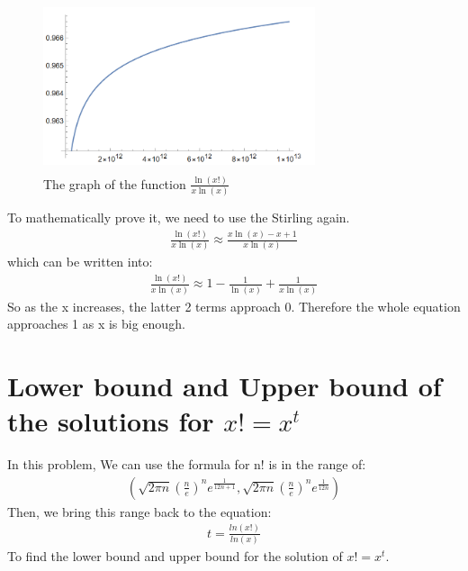 \documentclass{article}
\begin{document}
            \begin{figure}[h]
                \centering
                \includegraphics[width=8cm, height=5cm]{202.png}
                \caption{The graph of the function $\frac{\ln(x!)}{x\ln(x)}$}
                \end{figure}

        To mathematically prove it, we need to use the Stirling again.
            \begin{align*}
                \frac{\ln(x!)}{x\ln(x)} \approx \frac{x \ln(x) - x + 1}{x \ln(x)}
            \end{align*}
        which can be written into:
            \begin{align*}
                \frac{\ln(x!)}{x\ln(x)} \approx 1 - \frac{1}{\ln(x)} + \frac{1}{x\ln(x)}
            \end{align*}
        So as the x increases, the latter 2 terms approach 0. Therefore the whole equation approaches 1 as x is big enough.
        \section{Lower bound and Upper bound of the solutions for $x! = x ^ {t}$ }
        In this problem, We can use the formula for n! is in the range of:
            \begin{align*}
                (\sqrt{2\pi n} (\frac{n}{e})^n e^{\frac{1}{12n+1}},\sqrt{2\pi n} (\frac{n}{e})^n e^{\frac{1}{12n}})
            \end{align*}
        Then, we bring this range back to the equation:\\
            \begin{align*}
                t = \frac{ln(x!)}{ln(x)}
            \end{align*}
        To find the lower bound and upper bound for the solution of $x! = x^t$.\\
\end{document}

